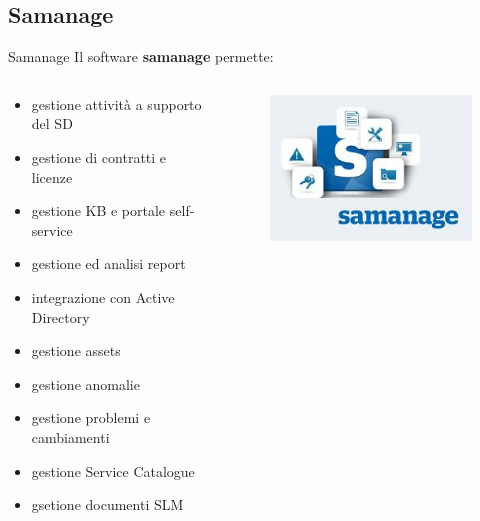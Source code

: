 \subsection*{Samanage}
\begin{frame}{Samanage}
Il software \textbf{samanage} permette:
\begin{columns}
\begin{column}{0.8\textwidth}
\begin{itemize}
\item{gestione attività a supporto del SD}
\item{gestione di contratti e licenze}
\item{gestione KB e portale self-service}
\item{gestione ed analisi report}
\item{integrazione con Active Directory}
\item{gestione assets}
\item{gestione anomalie}
\item{gestione problemi e cambiamenti}
\item{gestione Service Catalogue}
\item{gsetione documenti SLM}
\end{itemize}
\end{column}
\begin{column}{0.2\textwidth}
\begin{figure}
\hspace{-20mm}
\vspace{20mm}
\includegraphics[scale=0.4]{Images/Samanage.png}
\end{figure}
\end{column}
\end{columns}
\end{frame}